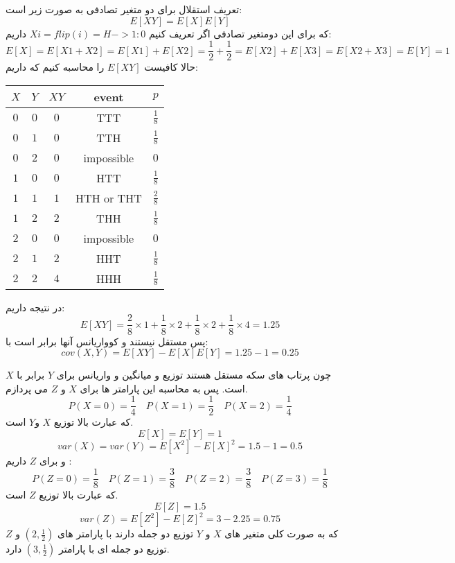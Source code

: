\problem{}
\subproblem{}
تعریف استقلال برای دو متغیر تصادفی به صورت زیر است:\\
\[ E[XY] = E[X]E[Y] \]
که برای این دومتغیر تصادفی اگر تعریف کنیم $Xi = flip(i) = H -> 1:0$ داریم:\\
\[ E[X] = E[X1+X2] = E[X1]+E[X2] = \frac{1}{2} + \frac{1}{2} = E[X2]+E[X3] = E[X2+X3] = E[Y] = 1 \]
حالا کافیست $E[XY]$ را محاسبه کنیم که داریم:\\


\begin{center}
    \begin{tabular}{|c|c|c|c|c|}
    \hline
    $X$ & $Y$ & $XY$ &  event & $p$\\
    \hline
    \hline

    $0$ & $0$ & $0$ & TTT & $\frac{1}{8}$\\
    \hline
    $0$ & $1$ & $0$ & TTH & $\frac{1}{8}$\\
    \hline
    $0$ & $2$ & $0$ & impossible & $0$\\
    \hline

    $1$ & $0$ & $0$ & HTT & $\frac{1}{8}$\\
    \hline
    $1$ & $1$ & $1$ & HTH or THT & $\frac{2}{8}$\\
    \hline
    $1$ & $2$ & $2$ & THH & $\frac{1}{8}$\\
    \hline

    $2$ & $0$ & $0$ & impossible & $0$\\
    \hline
    $2$ & $1$ & $2$ & HHT & $\frac{1}{8}$\\
    \hline
    $2$ & $2$ & $4$ & HHH & $\frac{1}{8}$\\
    \hline
    \end{tabular}
\end{center}
در نتیجه داریم:\\
\[ E[XY] = \frac{2}{8}\times 1 + \frac{1}{8}\times 2 +\frac{1}{8}\times 2 +\frac{1}{8}\times 4 = 1.25\]
پس مستقل نیستند و کوواریانس آنها برابر است با:\\
\[ cov(X,Y) = E[XY]-E[X]E[Y] = 1.25 - 1 = 0.25\]

\subproblem{}
چون پرتاب های سکه مستقل هستند توزیع و میانگین و واریانس برای $Y$ برابر با $X$ است.
پس به محاسبه این پارامتر ها برای $X$ و $Z$ می پردازم. \\

\[ P(X = 0) = \frac{1}{4} \quad P(X = 1) = \frac{1}{2} \quad P(X = 2) = \frac{1}{4}\]
که عبارت بالا توزیع $X$ و$Y$ است.
\[ E[X] = E[Y] = 1\]
\[ var(X) = var(Y) = E[X^2] - E[X]^2 = 1.5 - 1 = 0.5 \] 
و برای $Z$ داریم :
\[ P(Z = 0) = \frac{1}{8} \quad P(Z = 1) = \frac{3}{8} \quad P(Z = 2) = \frac{3}{8} \quad P(Z = 3) = \frac{1}{8}\]
که عبارت بالا توزیع $Z$ است.
\[ E[Z] = 1.5\]
\[ var(Z) = E[Z^2] - E[Z]^2 = 3 - 2.25 = 0.75 \] 
که به صورت کلی متغیر های $X$ و $Y$ توزیع دو جمله دارند با پارامتر های $(2,\frac{1}{2})$
و $Z$ توزیع دو جمله ای با پارامتر $(3,\frac{1}{2})$ دارد.